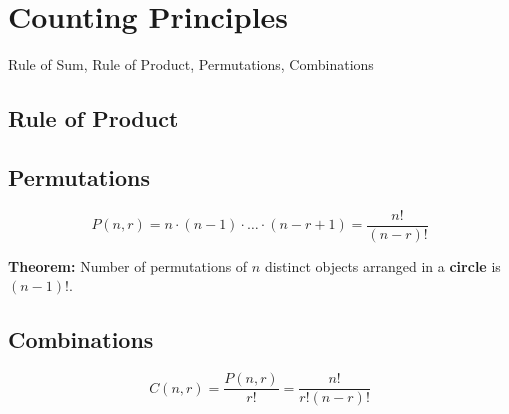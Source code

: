 \documentclass[12pt,a4paper]{article}
\begin{document}
\section*{Counting Principles}

Rule of Sum, Rule of Product, Permutations, Combinations

\subsection*{Rule of Product}

\subsection*{Permutations}

\[ P(n, r) = n \cdot (n-1) \cdot \dots \cdot (n-r+1) = \frac{n!}{(n-r)!} \]

\textbf{Theorem:} Number of permutations of $n$ distinct objects arranged in a \textbf{circle} is $(n-1)!$.

\subsection*{Combinations}

\[ C(n, r) = \frac{P(n, r)}{r!} = \frac{n!}{r!(n-r)!} \]
\end{document}

